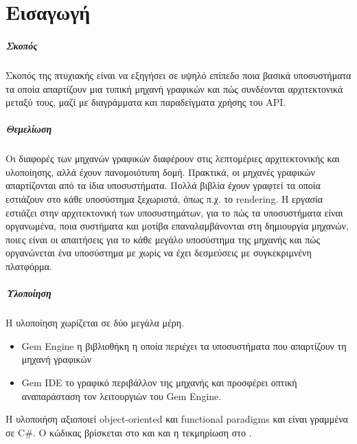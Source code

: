 \chapter{Εισαγωγή}
	\paragraph{Σκοπός} 
	Σκοπός της πτυχιακής είναι να εξηγήσει σε υψηλό επίπεδο ποια βασικά υποσυστήματα τα οποία απαρτίζουν μια
	τυπική μηχανή γραφικών και πώς συνδέονται αρχιτεκτονικά μεταξύ τους, μαζί με διαγράμματα και παραδείγματα χρήσης του \gls{API}. 
	
	\paragraph{Θεμελίωση} 	
	Οι διαφορές των μηχανών γραφικών διαφέρουν στις λεπτομέριες αρχιτεκτονικής και υλοποίησης, αλλά έχουν πανομοιότυπη δομή. Πρακτικά, οι μηχανές γραφικών απαρτίζονται από τα ίδια υποσυστήματα. Πολλά βιβλία έχουν γραφτεί τα οποία εστιάζουν στο κάθε υποσύστημα ξεχωριστά, όπως π.χ. το rendering.
	Η εργασία εστιάζει στην αρχιτεκτονική των υποσυστημάτων, για το πώς τα υποσυστήματα είναι οργανωμένα, ποια συστήματα και μοτίβα επαναλαμβάνονται στη δημιουργία μηχανών, ποιες είναι οι απαιτήσεις για το κάθε μεγάλο υποσύστημα της μηχανής και πώς οργανώνεται ένα υποσύστημα με χωρίς να έχει δεσμεύσεις με συγκεκριμνένη πλατφόρμα.

	\paragraph{Υλοποίηση}
	Η υλοποίηση χωρίζεται σε δύο μεγάλα μέρη.	
	\begin{itemize}
		\item {Gem Engine} η βιβλιοθήκη η οποία περιέχει τα υποσυστήματα που απαρτίζουν τη μηχανή γραφικών 
		\item {Gem IDE} το γραφικό περιβάλλον της μηχανής και προσφέρει οπτική αναπαράσταση τον λειτουργιών του Gem Engine.
	\end{itemize}
	H υλοποιήση αξιοποιεί object-oriented και functional paradigms και είναι γραμμένα σε C\#. Ο κώδικας βρίσκεται στο \cite{gem} και \cite{ginet} και η τεκμηρίωση στο \cite{gemDocs}.	
	
